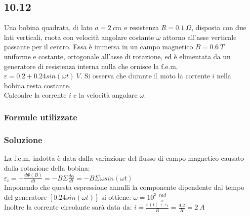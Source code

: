 \documentclass[../../main.tex]{subfiles}
\begin{document}
\subsection*{10.12}
Una bobina quadrata, di lato $a = 2\ cm$ e resistenza $R = 0.1\ \Omega$, disposta con due lati verticali, ruota con velocità angolare costante $\omega$ attorno all'asse verticale passante per il centro. Essa è immersa in un campo magnetico $B =0.6\ T$ uniforme e costante, ortogonale all'asse di rotazione, ed è elimentata da un generatore di resistenza interna nulla che ornisce la f.e.m. $\varepsilon = 0.2 + 0.24sin(\omega t)\ V$. Si osserva che durante il moto la corrente $i$ nella bobina resta costante.\\
Calcoalre la corrente $i$ e la velocità angolare $\omega$.
\subsubsection*{Formule utilizzate}
\subsubsection*{Soluzione}
La f.e.m. indotta è data dalla variazione del flusso di campo magnetico causato dalla rotazione della bobina:\\
$\varepsilon_i = -\frac{d\Phi(B)}{dt} = -B\Sigma\frac{d\alpha}{dt} = -B\Sigma \omega sin(\omega t)$\\
Imponendo che questa espressione annulli la componente dipendente dal tempo del generatore $[0.24 sin(\omega t)]$ si ottiene: $\omega = 10^3\ \frac{rad}{s}$\\
Inoltre la corrente circolante sarà data da: $i = \frac{\varepsilon(t) + \varepsilon_i}{R} = \frac{0.2}{R} = 2\ A$
\newpage
\end{document}

